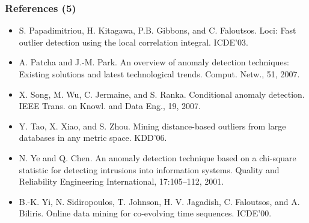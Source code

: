 \documentclass[aspectratio=169,t,xcolor=dvipsnames]{beamer}
\begin{document}
\begin{frame}
	\frametitle{References (5)}
	\begin{itemize}
		\item S. Papadimitriou, H. Kitagawa, P.B. Gibbons, and C. Faloutsos. Loci: Fast outlier detection using the local correlation integral. ICDE'03.
		\item A. Patcha and J.-M. Park. An overview of anomaly detection techniques: Existing solutions and latest technological trends. Comput. Netw., 51, 2007.
		\item X. Song, M. Wu, C. Jermaine, and S. Ranka. Conditional anomaly detection. IEEE Trans. on Knowl. and Data Eng., 19, 2007.
		\item Y. Tao, X. Xiao, and S. Zhou. Mining distance-based outliers from large databases in any metric space. KDD'06.
		\item N. Ye and Q. Chen. An anomaly detection technique based on a chi-square statistic for detecting intrusions into information systems. Quality and 			Reliability Engineering International, 17:105–112, 2001.
		\item B.-K. Yi, N. Sidiropoulos, T. Johnson, H. V. Jagadish, C. Faloutsos, and A. Biliris. Online data mining for co-evolving time sequences. ICDE'00.
	\end{itemize}
\end{frame}
\end{document}
